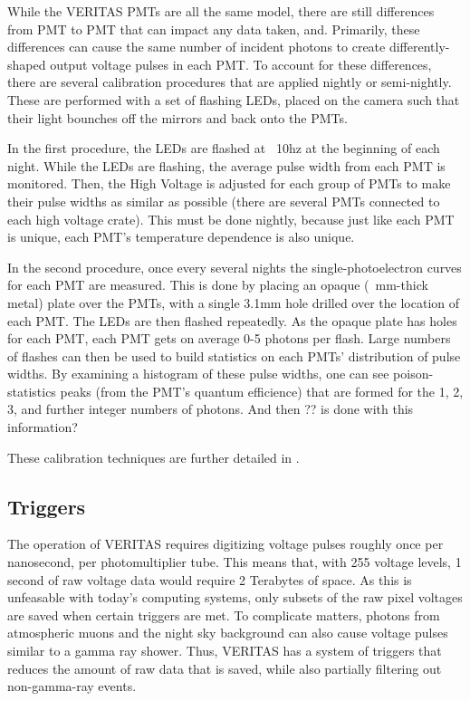 While the VERITAS PMTs are all the same model, there are still differences from PMT to PMT that can impact any data taken, and.
Primarily, these differences can cause the same number of incident photons to create differently-shaped output voltage pulses in each PMT.
To account for these differences, there are several calibration procedures that are applied nightly or semi-nightly.
These are performed with a set of flashing LEDs, placed on the camera such that their light bounches off the mirrors and back onto the PMTs.

In the first procedure, the LEDs are flashed at ~10hz at the beginning of each night.
While the LEDs are flashing, the average pulse width from each PMT is monitored.
Then, the High Voltage is adjusted for each group of PMTs to make their pulse widths as similar as possible (there are several PMTs connected to each high voltage crate).
This must be done nightly, because just like each PMT is unique, each PMT's temperature dependence is also unique.

In the second procedure, once every several nights the single-photoelectron curves for each PMT are measured.
This is done by placing an opaque (~mm-thick metal) plate over the PMTs, with a single 3.1mm hole drilled over the location of each PMT.
The LEDs are then flashed repeatedly.
As the opaque plate has holes for each PMT, each PMT gets on average 0-5 photons per flash.
Large numbers of flashes can then be used to build statistics on each PMTs' distribution of pulse widths.
By examining a histogram of these pulse widths, one can see poison-statistics peaks (from the PMT's quantum efficience) that are formed for the 1, 2, 3, and further integer numbers of photons.
And then ?? is done with this information?

These calibration techniques are further detailed in \cite{calib_techniques}.


\subsection{Triggers}\label{sec:trig}

The operation of VERITAS requires digitizing voltage pulses roughly once per nanosecond, per photomultiplier tube.
This means that, with 255 voltage levels, 1 second of raw voltage data would require 2 Terabytes of space.
As this is unfeasable with today's computing systems, only subsets of the raw pixel voltages are saved when certain triggers are met.
To complicate matters, photons from atmospheric muons and the night sky background can also cause voltage pulses similar to a gamma ray shower.
Thus, VERITAS has a system of triggers that reduces the amount of raw data that is saved, while also partially filtering out non-gamma-ray events.

